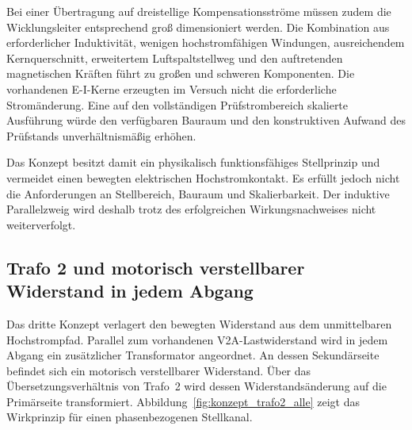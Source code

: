 Bei einer Übertragung auf dreistellige Kompensations\-ströme müssen zudem die
Wicklungs\-leiter entsprechend groß dimensioniert werden. Die Kombination aus
erforderlicher Induktivität, wenigen hochstromfähigen Windungen,
ausreichendem Kern\-querschnitt, erweitertem Luftspalt\-stellweg und den
auftretenden magnetischen Kräften führt zu großen und schweren Komponenten.
Die vorhandenen E-I-Kerne erzeugten im Versuch nicht die erforderliche
Stromänderung. Eine auf den vollständigen Prüfstrombereich skalierte
Ausführung würde den verfügbaren Bauraum und den konstruktiven Aufwand des
Prüfstands unverhältnismäßig erhöhen.

Das Konzept besitzt damit ein physikalisch funktionsfähiges Stellprinzip und
vermeidet einen bewegten elektrischen Hochstromkontakt. Es erfüllt jedoch
nicht die Anforderungen an Stellbereich, Bauraum und Skalierbarkeit. Der
induktive Parallelzweig wird deshalb trotz des erfolgreichen
Wirkungsnachweises nicht weiterverfolgt.


\subsection{Trafo 2 und motorisch verstellbarer Widerstand in jedem Abgang}
\label{sec:konzept_trafo2_alle_abgaenge}

Das dritte Konzept verlagert den bewegten Widerstand aus dem unmittelbaren
Hochstrompfad. Parallel zum vorhandenen V2A-Lastwiderstand wird in jedem
Abgang ein zusätzlicher Transformator angeordnet. An dessen Sekundärseite
befindet sich ein motorisch verstellbarer Widerstand. Über das
Übersetzungsverhältnis von Trafo~2 wird dessen Widerstandsänderung auf die
Primärseite transformiert. Abbildung~\ref{fig:konzept_trafo2_alle} zeigt das
Wirkprinzip für einen phasenbezogenen Stellkanal.

